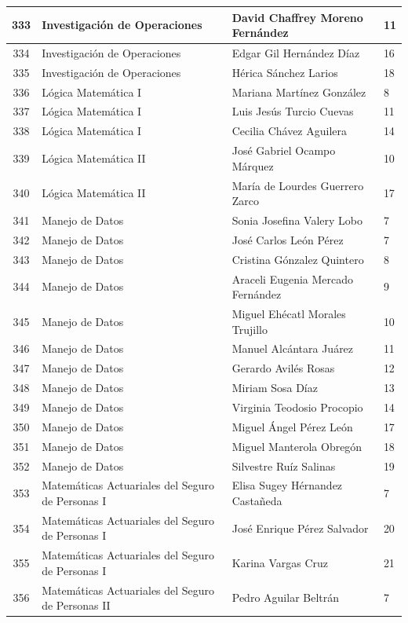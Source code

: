 {\begin{longtable}{|c|p{6.5cm}|p{5cm}|p{1.5cm}|}
333 & Investigación de Operaciones & David Chaffrey Moreno Fernández & 11 \\ \hline
334 & Investigación de Operaciones & Edgar Gil Hernández Díaz & 16 \\ \hline
335 & Investigación de Operaciones & Hérica Sánchez Larios & 18 \\ \hline
336 & Lógica Matemática I & Mariana Martínez González & 8 \\ \hline
337 & Lógica Matemática I & Luis Jesús Turcio Cuevas & 11 \\ \hline
338 & Lógica Matemática I & Cecilia Chávez Aguilera & 14 \\ \hline
339 & Lógica Matemática II & José Gabriel Ocampo Márquez & 10 \\ \hline
340 & Lógica Matemática II & María de Lourdes Guerrero Zarco & 17 \\ \hline
341 & Manejo de Datos & Sonia Josefina Valery Lobo & 7 \\ \hline
342 & Manejo de Datos & José Carlos León Pérez & 7 \\ \hline
343 & Manejo de Datos & Cristina Gónzalez Quintero & 8 \\ \hline
344 & Manejo de Datos & Araceli Eugenia Mercado Fernández & 9 \\ \hline
345 & Manejo de Datos & Miguel Ehécatl Morales Trujillo & 10 \\ \hline
346 & Manejo de Datos & Manuel Alcántara Juárez & 11 \\ \hline
347 & Manejo de Datos & Gerardo Avilés Rosas & 12 \\ \hline
348 & Manejo de Datos & Miriam Sosa Díaz & 13 \\ \hline
349 & Manejo de Datos & Virginia Teodosio Procopio & 14 \\ \hline
350 & Manejo de Datos & Miguel Ángel Pérez León & 17 \\ \hline
351 & Manejo de Datos & Miguel Manterola Obregón & 18 \\ \hline
352 & Manejo de Datos & Silvestre Ruíz Salinas & 19 \\ \hline
353 & Matemáticas Actuariales del Seguro de Personas I & Elisa Sugey Hérnandez Castañeda & 7 \\ \hline
354 & Matemáticas Actuariales del Seguro de Personas I & José Enrique Pérez Salvador & 20 \\ \hline
355 & Matemáticas Actuariales del Seguro de Personas I & Karina Vargas Cruz & 21 \\ \hline
356 & Matemáticas Actuariales del Seguro de Personas II & Pedro Aguilar Beltrán & 7 \\ \hline

\end{longtable}}

